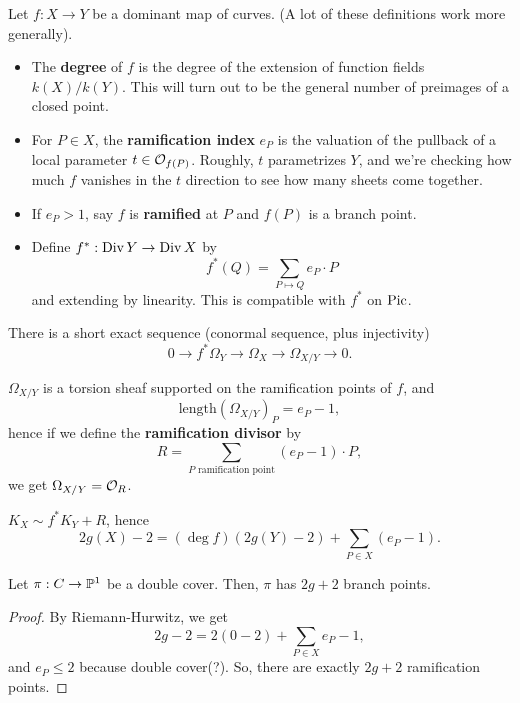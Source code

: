\documentclass[12pt]{article}
\begin{document}
\begin{defn}
    Let $f:X\to Y$ be a dominant map of curves. (A lot of these definitions work more generally).
    \begin{itemize}
        \item The \textbf{degree} of $f$ is the degree of the extension of function fields $k(X)/k(Y)$. This will turn out to be the general number of preimages of a closed point.
        \item For $P\in X$, the \textbf{ramification index} $e_P$ is the valuation of the pullback of a local parameter $t\in \cO_{f(P)}$. Roughly, $t$ parametrizes $Y$, and we're checking how much $f$ vanishes in the $t$ direction to see how many sheets come together.
        \item If $e_P > 1$, say $f$ is \textbf{ramified} at $P$ and $f(P)$ is a branch point.
        \item Define $f^*: \Div Y \to \Div X$ by
        \[f^*(Q) = \sum_{P\mapsto Q} e_P \cdot P\]
        and extending by linearity. This is compatible with $f^*$ on $\Pic$.
    \end{itemize}
\end{defn}

\begin{prop}
    There is a short exact sequence (conormal sequence, plus injectivity)
    \[0\to f^* \Omega_Y \to \Omega_X \to \Omega_{X/Y} \to 0.\]
\end{prop}

\begin{prop}
    $\Omega_{X/Y}$ is a torsion sheaf supported on the ramification points of $f$, and
    \[\mathrm{length}(\Omega_{X/Y})_P = e_P -1,\]
    hence if we define the \textbf{ramification divisor} by
    \[R = \sum_{P \text{ ramification point}} (e_P-1)\cdot P,\]
    we get $\Omega_{X/Y} = \cO_R$.
\end{prop}

\begin{thm}
    $K_X \sim f^* K_Y + R$, hence
    \[2g(X) - 2 = (\deg f)(2g(Y)-2) + \sum_{P\in X}(e_P-1).\]
\end{thm}

\begin{cor}
    Let $\pi: C\to \P^1$ be a double cover. Then, $\pi$ has $2g+2$ branch points.
\end{cor}
\begin{proof}
    By Riemann-Hurwitz, we get
    \[2g-2 = 2(0-2)+ \sum_{P\in X} e_P-1,\]
    and $e_P \leq 2$ {\color{red} because double cover(?)}. So, there are exactly $2g+2$ ramification points.
\end{proof}


\end{document}
